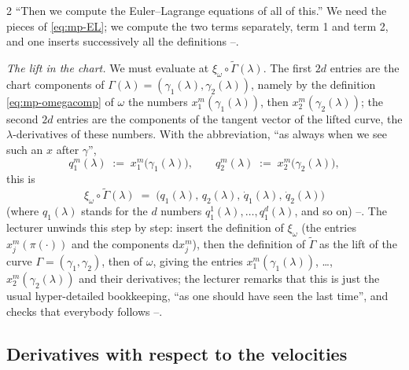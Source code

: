 \begin{paracol}{2}
``Then we compute the Euler--Lagrange equations of all of this.'' We need the pieces of \eqref{eq:mp-EL}; we compute the two terms separately, term 1 and term 2, and one inserts successively all the definitions --.

\emph{The lift in the chart.} We must evaluate at $\xi_\omega\circ\tilde\Gamma(\lambda)$. The first $2d$ entries are the chart components of $\Gamma(\lambda)=(\gamma_1(\lambda),\gamma_2(\lambda))$, namely by the definition \eqref{eq:mp-omegacomp} of $\omega$ the numbers $x_1^m(\gamma_1(\lambda))$, then $x_2^m(\gamma_2(\lambda))$; the second $2d$ entries are the components of the tangent vector of the lifted curve, the $\lambda$-derivatives of these numbers. With the abbreviation, ``as always when we see such an $x$ after $\gamma$'',
\begin{equation}\label{eq:mp-q}
  q_1^m(\lambda)\;:=\;x_1^m\bigl(\gamma_1(\lambda)\bigr),\qquad q_2^m(\lambda)\;:=\;x_2^m\bigl(\gamma_2(\lambda)\bigr),
\end{equation}
this is
\begin{equation}\label{eq:mp-lift}
  \xi_\omega\circ\tilde\Gamma(\lambda)\;=\;\bigl(q_1(\lambda),\,q_2(\lambda),\,\dot q_1(\lambda),\,\dot q_2(\lambda)\bigr)
\end{equation}
(where $q_1(\lambda)$ stands for the $d$ numbers $q_1^1(\lambda),\dots,q_1^d(\lambda)$, and so on) --. The lecturer unwinds this step by step: insert the definition of $\xi_\omega$ (the entries $x_j^m(\pi(\cdot))$ and the components $\mathrm dx_j^m$), then the definition of $\tilde\Gamma$ as the lift of the curve $\Gamma=(\gamma_1,\gamma_2)$, then of $\omega$, giving the entries $x_1^m(\gamma_1(\lambda))$, \dots, $x_2^m(\gamma_2(\lambda))$ and their derivatives; the lecturer remarks that this is just the usual hyper-detailed bookkeeping, ``as one should have seen the last time'', and checks that everybody follows --.

\subsection{Derivatives with respect to the velocities}\label{ssec:mp-dbeta}


\end{paracol}
